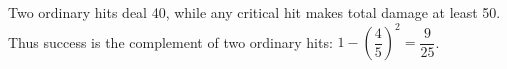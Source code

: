 Two ordinary hits deal 40, while any critical hit makes total damage at least 50. Thus success is the complement of two ordinary hits: $1-(\dfrac{4}{5})^2=\boxed{\dfrac{9}{25}}$.
